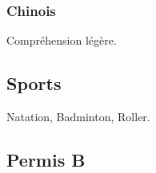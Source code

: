 \documentclass{article}
\begin{document}
\begin{multicols}{2}
                \subsubsection{Chinois}
                    Compr\'ehension l\'eg\`ere.
                \subsection{Sports}
                    Natation, Badminton, Roller.
                \subsection{Permis B}
    \end{multicols}
\end{document}
